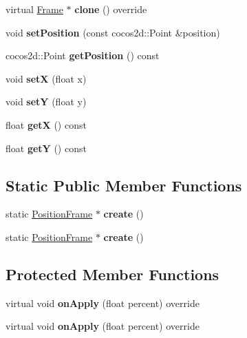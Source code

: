 \begin{DoxyCompactItemize}
virtual \hyperlink{classFrame}{Frame} $\ast$ {\bfseries clone} () override
\item 
\mbox{\label{classPositionFrame_a1b1d6c95709122a0136a1fefdb793109}} 
void {\bfseries set\+Position} (const cocos2d\+::\+Point \&position)
\item 
\mbox{\label{classPositionFrame_a31e1c5ecb13a1259067959afad4381c9}} 
cocos2d\+::\+Point {\bfseries get\+Position} () const
\item 
\mbox{\label{classPositionFrame_a7b86c2def22524f587b190825d9c48eb}} 
void {\bfseries setX} (float x)
\item 
\mbox{\label{classPositionFrame_a35b5929abf5915ca401d7031b766c441}} 
void {\bfseries setY} (float y)
\item 
\mbox{\label{classPositionFrame_aabe609493f938c6cafae2ff3058cca83}} 
float {\bfseries getX} () const
\item 
\mbox{\label{classPositionFrame_aebe0877116f91e36e43dcdc32447c5dc}} 
float {\bfseries getY} () const
\end{DoxyCompactItemize}
\subsection*{Static Public Member Functions}
\begin{DoxyCompactItemize}
\item 
\mbox{\label{classPositionFrame_a941a960f3599756e9883cd3f3a6e5257}} 
static \hyperlink{classPositionFrame}{Position\+Frame} $\ast$ {\bfseries create} ()
\item 
\mbox{\label{classPositionFrame_a1b2d4d2b58738a0527e5a019af7763a8}} 
static \hyperlink{classPositionFrame}{Position\+Frame} $\ast$ {\bfseries create} ()
\end{DoxyCompactItemize}
\subsection*{Protected Member Functions}
\begin{DoxyCompactItemize}
\item 
\mbox{\label{classPositionFrame_af27d5c99f604d62bcc336a847c5da109}} 
virtual void {\bfseries on\+Apply} (float percent) override
\item 
\mbox{\label{classPositionFrame_ad6f3ef8536447da146f4240fb79b80ac}} 
virtual void {\bfseries on\+Apply} (float percent) override
\end{DoxyCompactItemize}
